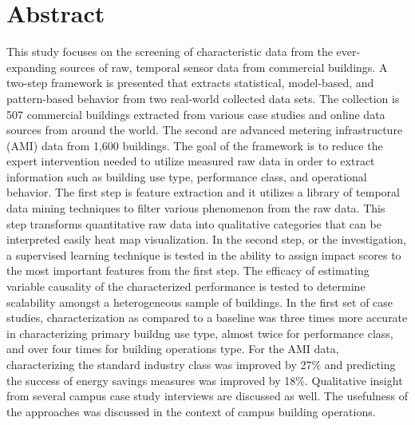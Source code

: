 \chapter{Abstract}

This study focuses on the screening of characteristic data from the ever-expanding sources of raw, temporal sensor data from commercial buildings. A two-step framework is presented that extracts statistical, model-based, and pattern-based behavior from two real-world collected data sets. The collection is 507 commercial buildings extracted from various case studies and online data sources from around the world. The second are advanced metering infrastructure (AMI) data from 1,600 buildings. The goal of the framework is to reduce the expert intervention needed to utilize measured raw data in order to extract information such as building use type, performance class, and operational behavior. The first step is feature extraction and it utilizes a library of temporal data mining techniques to filter various phenomenon from the raw data. This step transforms quantitative raw data into qualitative categories that can be interpreted easily heat map visualization. In the second step, or the investigation, a supervised learning technique is tested in the ability to assign impact scores to the most important features from the first step. The efficacy of estimating variable causality of the characterized performance is tested to determine scalability amongst a heterogeneous sample of buildings. In the first set of case studies, characterization as compared to a baseline was three times more accurate in characterizing primary buildng use type, almost twice for performance class, and over four times for building operations type. For the AMI data, characterizing the standard industry class was improved by 27\% and predicting the success of energy savings measures was improved by 18\%. Qualitative insight from several campus case study interviews are discussed as well. The usefulness of the approaches was discussed in the context of campus building operations.